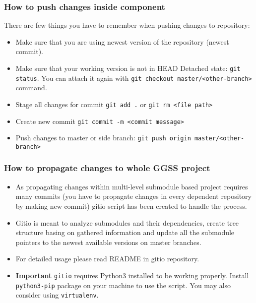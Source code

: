 \subsubsection*{How to push changes inside component}
There are few things you have to remember when pushing changes to repository:
\begin{itemize}
    \item Make sure that you are using newest version of the repository (newest commit).
    \item Make sure that your working version is not in HEAD Detached state: \lstinline{git status}. You can attach it again with \lstinline{git checkout master/<other-branch>} command.
    \item Stage all changes for commit \lstinline{git add .} or \lstinline{git rm <file path>}
    \item Create new commit \lstinline{git commit -m <commit message>}
    \item Push changes to master or side branch: \lstinline{git push origin master/<other-branch>}
\end{itemize}

\subsubsection*{How to propagate changes to whole GGSS project}
\begin{itemize}
    \item As propagating changes within multi-level submodule based project requires many commits (you have to propagate changes in every dependent repository by making new commit) gitio script has been created to handle the process.
    \item Gitio is meant to analyze submodules and their dependencies, create tree structure basing on gathered information and update all the submodule pointers to the newest available versions on master branches.
    \item For detailed usage please read README in gitio repository.
    \item \textbf{Important} \lstinline{gitio} requires Python3 installed to be working properly. Install \lstinline{python3-pip} package on your machine to use the script. You may also consider using \lstinline{virtualenv}.
\end{itemize}


